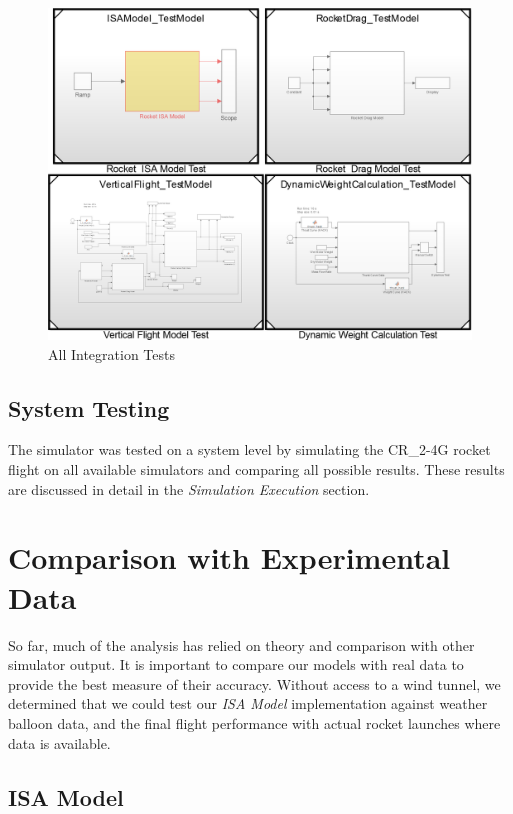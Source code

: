 \documentclass[]{book}
\begin{document}
\begin{figure}[htbp]
\centering
\includegraphics{images/ALL_TESTS.png}
\caption{All Integration Tests \label{all_integration_tests_label}}
\end{figure}

\clearpage

\section{System Testing}\label{system-testing}

The simulator was tested on a system level by simulating the CR\_2-4G
rocket flight on all available simulators and comparing all possible
results. These results are discussed in detail in the \emph{Simulation
Execution} section.

\chapter{Comparison with Experimental
Data}\label{comparison-with-experimental-data}

So far, much of the analysis has relied on theory and comparison with
other simulator output. It is important to compare our models with real
data to provide the best measure of their accuracy. Without access to a
wind tunnel, we determined that we could test our \emph{ISA Model}
implementation against weather balloon data, and the final flight
performance with actual rocket launches where data is available.

\section{ISA Model}\label{isa-model}
\end{document}
